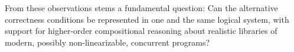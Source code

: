From these observations stems a fundamental question: Can the
alternative correctness conditions be represented in one and the same
logical system, with support for higher-order compositional reasoning
about realistic libraries of modern, possibly non-linearizable,
concurrent programs?
%


%


